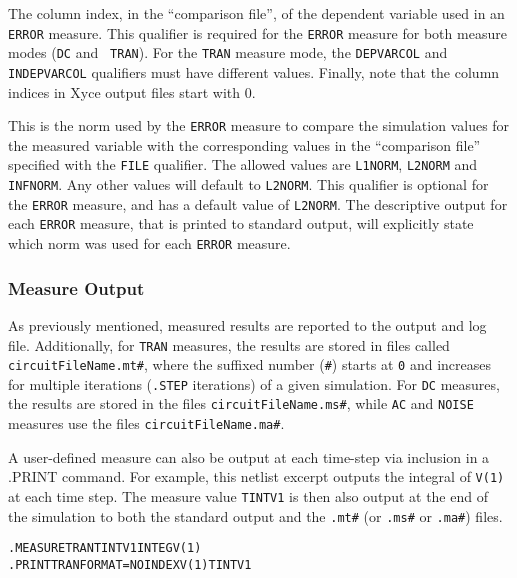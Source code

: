 \begin{Command}
\begin{Arguments}
The column index, in the ``comparison file'', of the dependent
variable used in an {\tt ERROR} measure.  This qualifier is required
for the {\tt ERROR} measure for both measure modes ({\tt DC} and {\tt
TRAN}).  For the {\tt TRAN} measure mode, the {\tt DEPVARCOL} and {\tt
INDEPVARCOL} qualifiers must have different values.  Finally, note
that the column indices in Xyce output files start with 0.

This is the norm used by the {\tt ERROR} measure to compare the
simulation values for the measured variable with the corresponding
values in the ``comparison file'' specified with the {\tt FILE}
qualifier.  The allowed values are {\tt L1NORM}, {\tt L2NORM} and {\tt
INFNORM}.  Any other values will default to {\tt L2NORM}.  This
qualifier is optional for the {\tt ERROR} measure, and has a default
value of {\tt L2NORM}.  The descriptive output for each {\tt ERROR}
measure, that is printed to standard output, will explicitly state
which norm was used for each {\tt ERROR} measure.

\end{Arguments}

\end {Command}

\subsubsection{Measure Output}
\label{Measure_Measurement_Output}
As previously mentioned, measured results are reported to the output
and log file.  Additionally, for \texttt{TRAN} measures, the results
are stored in files called
\texttt{circuitFileName.mt\#}, where the suffixed number (\texttt{\#}) starts
at \texttt{0} and increases for multiple iterations (\texttt{.STEP}
iterations) of a given simulation. For \texttt{DC} measures, the results are
stored in the files \texttt{circuitFileName.ms\#}, while \texttt{AC} and
\texttt{NOISE} measures use the files \texttt{circuitFileName.ma\#}.

A user-defined measure can also be output at each time-step via
inclusion in a .PRINT command.  For example, this netlist excerpt
outputs the integral of {\tt V(1)} at each time step.  The measure
value {\tt TINTV1} is then also output at the end of the simulation to
both the standard output and the \texttt{.mt\#} (or \texttt{.ms\#}
or \texttt{.ma\#}) files.
\begin{alltt}
.MEASURE TRAN TINTV1 INTEG V(1)
.PRINT TRAN FORMAT=NOINDEX V(1) TINTV1
\end{alltt}

